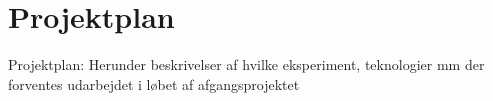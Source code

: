 \chapter{Projektplan}
Projektplan: Herunder beskrivelser af hvilke eksperiment, teknologier mm der forventes udarbejdet i løbet af afgangsprojektet